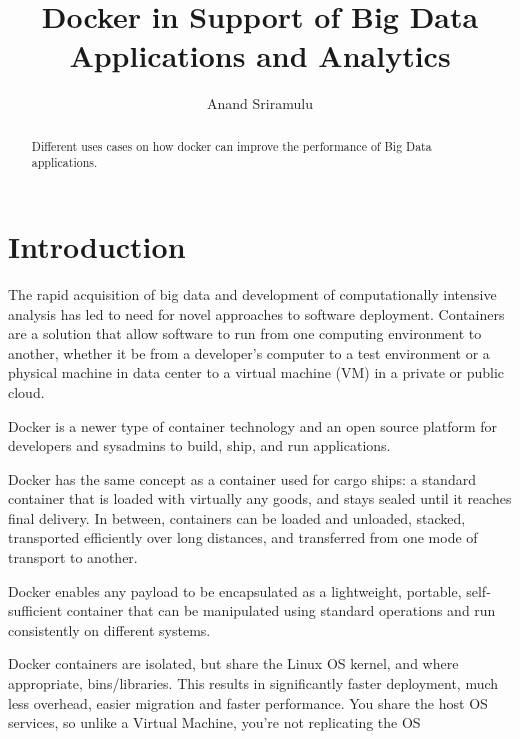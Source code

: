 \documentclass[sigconf]{acmart}
\begin{document}
	\title {Docker in Support of Big Data Applications and Analytics}
	
	
	\author{Anand Sriramulu}
	
	
	\renewcommand{\shortauthors}{Anand S}
	
	
	\begin{abstract}
		Different uses cases on how docker can improve the performance of Big Data applications.
	\end{abstract}
	
	
	\maketitle
	
	\section{Introduction}
	The rapid acquisition of big data and development of computationally intensive analysis has led to need for novel approaches to software deployment. Containers are a solution that allow software to run from one computing environment to another, whether it be from a developer's computer to a test environment or a physical machine in data center to a virtual machine (VM) in a private or public cloud.  
	
	Docker is a newer type of container technology and an open source platform for developers and sysadmins to build, ship, and run applications.
	
	Docker has the same concept as a container used for cargo ships: a standard container that is loaded with virtually any goods, and stays sealed until it reaches final delivery. In between, containers can be loaded and unloaded, stacked, transported efficiently over long distances, and transferred from one mode of transport to another. \cite{AboutDocker}
	
	Docker enables any payload to be encapsulated as a lightweight, portable, self-sufficient container that can be manipulated using standard operations and run consistently on different systems.
	
	Docker containers are isolated, but share the Linux OS kernel, and where appropriate, bins/libraries. This results in significantly faster deployment, much less overhead, easier migration and faster performance. You share the host OS services, so unlike a Virtual Machine, you're not replicating the OS
	
\end{document}

